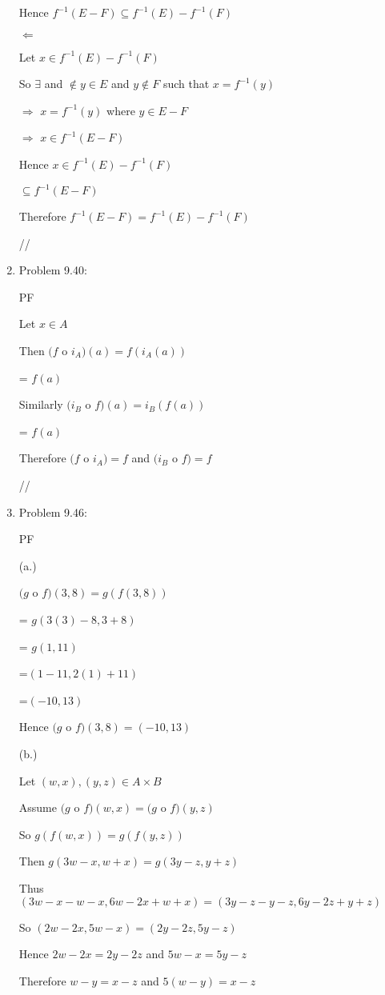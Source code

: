 \documentclass[12pt]{article}
\begin{document}
\begin{enumerate}
{Hence $f^{-1}(E-F) \subseteq f^{-1}(E)-f^{-1}(F)$
 
$\Leftarrow$

Let $x \in f^{-1}(E)-f^{-1}(F)$

So $\exists $ and $\notin y \in E$ and $ y \notin F$  such that $x =  f^{-1}(y)$

$\Rightarrow$ $x = f^{-1}(y)$  where $y \in E - F$

$\Rightarrow$ $x \in f^{-1}(E-F)$

Hence $x \in f^{-1}(E)-f^{-1}(F) $

$\subseteq  f^{-1}(E-F)$ 

Therefore  $ f^{-1}(E-F) = f^{-1}(E)-f^{-1}(F) $

//
}


\item Problem 9.40:

{PF

Let $x \in A$

Then  $(f  $ o $i_A)(a) = f(i_A(a))$

= $f(a)$

Similarly  $(i_B$ o $f)(a) = i_B(f(a))$

= $f(a)$

Therefore $(f  $ o $i_A) = f $ and $(i_B$ o $f) = f$

//
}

\item Problem 9.46: 

{PF

(a.)

$(g$ o $f)(3,8) = g(f(3,8))$

= $g(3(3)-8, 3+8)$

= $g(1,11)$

=$(1-11, 2(1) + 11)$

=$(-10, 13)$

Hence $(g$ o $f)(3,8) = (-10,13)$

(b.)

Let $(w,x),(y,z) \in A \times B$

Assume $(g$ o $f)(w,x) = (g$ o $f)(y,z)$

So $g(f(w,x)) = g(f(y,z))$

Then $g(3w-x,w+x) = g(3y - z, y+z)$

Thus $(3w - x - w -x, 6w -2x + w +x) = (3y - z - y - z, 6y -2z + y +z)$

So $(2w - 2x, 5w -x) = (2y - 2z, 5y -z)$

Hence $2w - 2x = 2y - 2z$ and $5w - x = 5y -z$

Therefore $w-y = x-z$ and $5(w-y) = x - z$

}
\end{enumerate}
\end{document}
